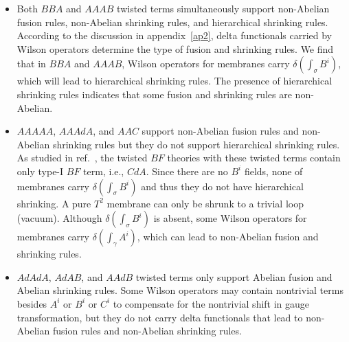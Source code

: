 \documentclass[11pt,nofootinbib,preprint]{revtex4-1}
\begin{document}
\begin{itemize}
\item Both $BBA$ and $AAAB$ twisted terms simultaneously support non-Abelian fusion rules, non-Abelian shrinking rules, and hierarchical shrinking rules. According to the discussion in appendix~\ref{ap2}, delta functionals carried by Wilson operators determine the type of fusion and shrinking rules. We find that in $BBA$ and $AAAB$, Wilson operators for membranes carry $\delta \left( \int_{\sigma}{B^i} \right) $, which will lead to hierarchical shrinking rules. The presence of hierarchical shrinking rules indicates that some fusion and shrinking rules are non-Abelian.

\item $AAAAA$, $AAAdA$, and $AAC$ support non-Abelian fusion rules and non-Abelian shrinking rules but they do not support hierarchical shrinking rules. As studied in ref.~\cite{Zhang:2021ycl}, the twisted $BF$ theories with these twisted terms contain only type-I $BF$ term, i.e., $CdA$. Since there are no $B^i$ fields, none of membranes carry $\delta \left( \int_{\sigma}{B^i} \right) $ and thus they do not have hierarchical shrinking. A pure $T^2$ membrane can only be shrunk to a trivial loop (vacuum). Although $\delta \left( \int_{\sigma}{B^i} \right) $ is absent, some Wilson operators for membranes carry $\delta \left( \int_{\gamma}{A^i} \right) $, which can lead to non-Abelian fusion and shrinking rules.

\item $AdAdA$, $AdAB$, and $AAdB$ twisted terms only support Abelian fusion and Abelian shrinking rules. Some Wilson operators may contain nontrivial terms besides $A^i$ or $B^i$ or $C^i$ to compensate for the nontrivial shift in gauge transformation, but they do not carry delta functionals that lead to non-Abelian fusion rules and non-Abelian shrinking rules.
\end{itemize}
\end{document}
